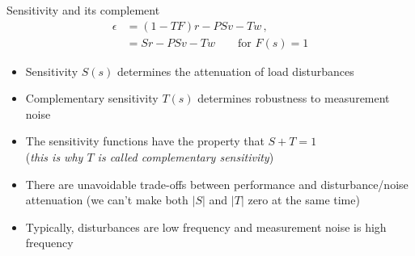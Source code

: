 \documentclass[10pt]{beamer-control}
\begin{document}
\begin{frame}{Sensitivity and its complement}
  \begin{align}
    \epsilon & = (1-TF)r - PSv - Tw \,, \\
    & = Sr - PSv - Tw \qquad\text{for $F(s)=1$}
  \end{align}
  \begin{itemize}
    \item Sensitivity $S(s)$ determines the attenuation of load disturbances
    \item Complementary sensitivity $T(s)$ determines robustness to measurement noise
    \item The sensitivity functions have the property that $S+T=1$\\ (\emph{this is why $T$ is called complementary sensitivity})
    \item There are unavoidable trade-offs between performance and disturbance/noise attenuation (we can't make both $|S|$ and $|T|$ zero at the same time)
    \item Typically, disturbances are low frequency and measurement noise is high frequency
  \end{itemize}
\end{frame}

\SUMMARYFRAME
\FINALE
\end{document}
